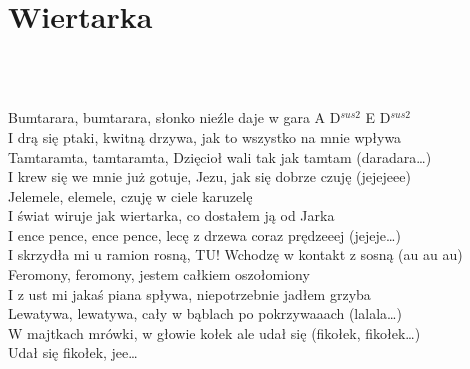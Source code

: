 \documentclass[a5paper, 10pt]{book}
\begin{document}
\section{Wiertarka}\textcolor{lightgray}{\textit{}}\\~\\
\begin{minipage}[t]{1\textwidth}
  Bumtarara, bumtarara, słonko nieźle daje w gara \hfill A D$^{sus2}$ E D$^{sus2}$\\
  I drą się ptaki, kwitną drzywa, jak to wszystko na mnie wpływa\\
  Tamtaramta, tamtaramta, Dzięcioł wali tak jak tamtam (daradara…)\\
  I krew się we mnie już gotuje, Jezu, jak się dobrze czuję (jejejeee)\\
  Jelemele, elemele, czuję w ciele karuzelę\\
  I świat wiruje jak wiertarka, co dostałem ją od Jarka\\
  \hspace*{5mm}I ence pence, ence pence, lecę z drzewa coraz prędzeeej (jejeje…)\\
  \hspace*{5mm}I skrzydła mi u ramion rosną, TU! Wchodzę w kontakt z sosną (au au au)\\
  Feromony, feromony, jestem całkiem oszołomiony\\
  I z ust mi jakaś piana spływa, niepotrzebnie jadłem grzyba\\
  \hspace*{5mm}Lewatywa, lewatywa, cały w bąblach po pokrzywaaach (lalala…)\\
  \hspace*{5mm}W majtkach mrówki, w głowie kołek ale udał się (fikołek, fikołek…)\\
  \hspace*{5mm}Udał się fikołek, jee…\\
\end{minipage}
\begin{minipage}[t]{0\textwidth}
\end{minipage}

\newpage
\end{document}
